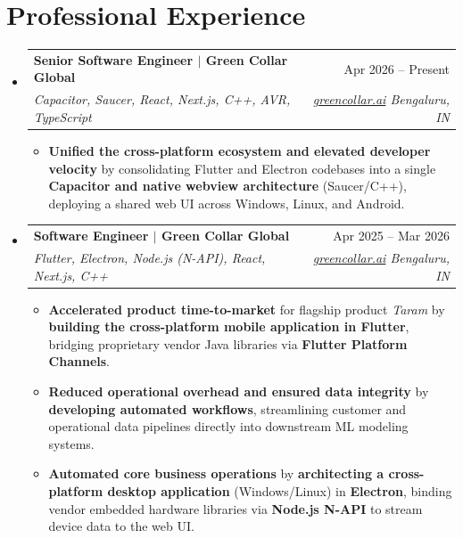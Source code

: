 \documentclass[11pt]{article}
\makeatletter
\newcommand{\resumeSubheading}[4]{
  \vspace{-1pt}
\item
  \begin{tabular*}{0.98\textwidth}{@{}l@{\extracolsep{\fill}}r@{}}
    \textbf{#1} & #2 \\[1pt]
    \textit{\small#3} & \textit{\small #4} \\
  \end{tabular*}\vspace{-2pt}
}
\makeatother
\begin{document}
\section*{Professional Experience}
\begin{itemize}

    \resumeSubheading
    {Senior Software Engineer $|$ Green Collar Global}{Apr 2026 -- Present}
    {Capacitor, Saucer, React, Next.js, C++, AVR, TypeScript}
    {\href{https://greencollar.ai}{\textnormal{\faExternalLink}greencollar.ai}
    \textbar{} Bengaluru, IN}
    \begin{itemize}
      \item \textbf{Unified the cross-platform ecosystem and elevated
        developer velocity} by consolidating Flutter and Electron
        codebases into a single \textbf{Capacitor and native webview
        architecture} (Saucer/C++), deploying a shared web UI across
        Windows, Linux, and Android.
    \end{itemize}

    \resumeSubheading
    {Software Engineer $|$ Green Collar Global}{Apr 2025 -- Mar 2026}
    {Flutter, Electron, Node.js (N-API), React, Next.js, C++}
    {\href{https://greencollar.ai}{\textnormal{\faExternalLink}greencollar.ai}
    \textbar{} Bengaluru, IN}
    \begin{itemize}
      \item \textbf{Accelerated product time-to-market} for flagship
        product \textit{Taram} by \textbf{building the cross-platform
        mobile application in Flutter}, bridging proprietary vendor
        Java libraries via \textbf{Flutter Platform Channels}.
      \item \textbf{Reduced operational overhead and ensured data
        integrity} by \textbf{developing automated workflows},
        streamlining customer and operational data pipelines directly
        into downstream ML modeling systems.
      \item \textbf{Automated core business operations} by
        \textbf{architecting a cross-platform desktop application}
        (Windows/Linux) in \textbf{Electron}, binding vendor embedded
        hardware libraries via \textbf{Node.js N-API} to stream
        device data to the web UI.
    \end{itemize}


\end{itemize}
\end{document}
